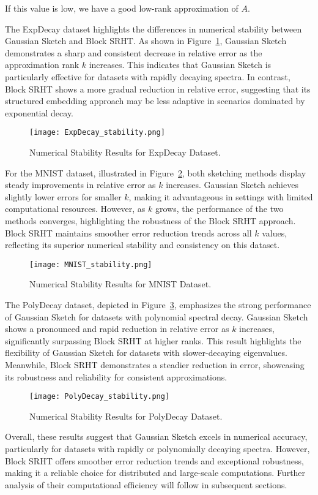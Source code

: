 \documentclass[a4paper, 12pt,oneside]{article}
\begin{document}
	If this value is low, we have a good low-rank approximation of \(A\).

	The ExpDecay dataset highlights the differences in numerical stability between Gaussian Sketch and Block SRHT. As shown in Figure~\ref{fig:expdecay}, Gaussian Sketch demonstrates a sharp and consistent decrease in relative error as the approximation rank \(k\) increases. This indicates that Gaussian Sketch is particularly effective for datasets with rapidly decaying spectra. In contrast, Block SRHT shows a more gradual reduction in relative error, suggesting that its structured embedding approach may be less adaptive in scenarios dominated by exponential decay.
	\begin{figure}[H]
	\centering
	\texttt{[image: ExpDecay\_stability.png]}
	\caption{Numerical Stability Results for ExpDecay Dataset.}
	\label{fig:expdecay}
	\end{figure}
	For the MNIST dataset, illustrated in Figure~\ref{fig:mnist}, both sketching methods display steady improvements in relative error as \(k\) increases. Gaussian Sketch achieves slightly lower errors for smaller \(k\), making it advantageous in settings with limited computational resources. However, as \(k\) grows, the performance of the two methods converges, highlighting the robustness of the Block SRHT approach. 
	Block SRHT maintains smoother error reduction trends across all \(k\) values, reflecting its superior numerical stability and consistency on this dataset.
	\begin{figure}[H]
	\centering
	\texttt{[image: MNIST\_stability.png]}
	\caption{Numerical Stability Results for MNIST Dataset.}
	\label{fig:mnist}
	\end{figure}
	The PolyDecay dataset, depicted in Figure~\ref{fig:polydecay}, emphasizes the strong performance of Gaussian Sketch for datasets with polynomial spectral decay. Gaussian Sketch shows a pronounced and rapid reduction in relative error as \(k\) increases, significantly surpassing Block SRHT at higher ranks. This result highlights the flexibility of Gaussian Sketch for datasets with slower-decaying eigenvalues. Meanwhile, Block SRHT demonstrates a steadier reduction in error, showcasing its robustness and reliability for consistent approximations.
	\begin{figure}[H]
	\centering
	\texttt{[image: PolyDecay\_stability.png]}
	\caption{Numerical Stability Results for PolyDecay Dataset.}
	\label{fig:polydecay}
	\end{figure}
	Overall, these results suggest that Gaussian Sketch excels in numerical accuracy, particularly for datasets with rapidly or polynomially decaying spectra. However, Block SRHT offers smoother error reduction trends and exceptional robustness, making it a reliable choice for distributed and large-scale computations. Further analysis of their computational efficiency will follow in subsequent sections.
\end{document}
